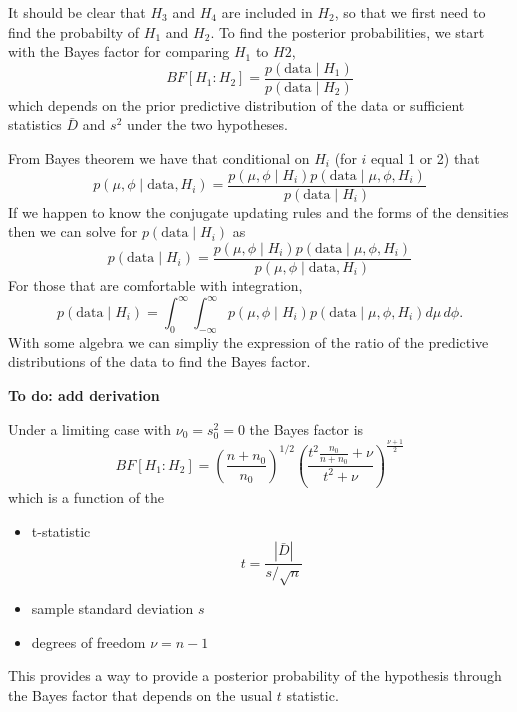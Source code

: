 \documentclass[11pt]{article}
\def\BF{\textit{BF}}
\def\n0{n_0}
\def\data{\text{data}}
\begin{document}
It should be clear that $H_3$ and $H_4$ are included in $H_2$, so that we first need to find the probabilty of $H_1$ and $H_2$.    To find the posterior probabilities, we start with the Bayes factor for comparing $H_1$  to $H2$,
$$
\BF[H_1: H_2] = \frac{p(\data \mid H_1)} {p(\data \mid H_2)}
$$
which depends on the prior predictive distribution of the data or sufficient statistics $\bar{D}$ and $s^2$ under the two hypotheses. 


From Bayes theorem we have that conditional on $H_i$ (for $i$ equal 1 or 2) that
$$p(\mu, \phi  \mid \data, H_i) = \frac{p(\mu, \phi \mid H_i) p(\data \mid \mu, \phi, H_i)}{p(\data \mid H_i)}$$
If we happen to know the conjugate updating rules and the forms of the densities then we can solve for $p(\data \mid H_i)$ as
$$
p(\data \mid H_i) = \frac{p(\mu, \phi  \mid H_i) p(\data \mid \mu, \phi, H_i)}{p(\mu, \phi \mid \data, H_i)}
$$
For those that are comfortable with integration,
$$
p(\data \mid H_i) = \int_0^\infty \int_{-\infty}^\infty p(\mu, \phi  \mid H_i) p(\data \mid \mu, \phi, H_i) d \mu \, d \phi.
$$
With some algebra we can simpliy the expression of the ratio of the predictive distributions of the data to find the Bayes factor. 

{\bf To do: add derivation}

Under a limiting case with $\nu_0 =s^2_0 = 0$ the Bayes factor is   
    $$
   \BF[H_1 : H_2] = \left(\frac{n + \n0}{\n0} \right)^{1/2} \left(
  \frac{ t^2  \frac{\n0}{n + \n0} + \nu }
  { t^2  + \nu} \right)^{\frac{\nu + 1}{2}}
    $$
which is a function of the 
\begin{itemize}
\item t-statistic $$t = \frac{|\bar{D}|}{s/\sqrt{n}}$$   
\item sample standard deviation $s$ 
\item degrees of freedom $\nu = n -1$
\end{itemize}

This provides a way to provide a posterior probability of the hypothesis through the Bayes factor that depends on the usual $t$ statistic. 
\end{document}
